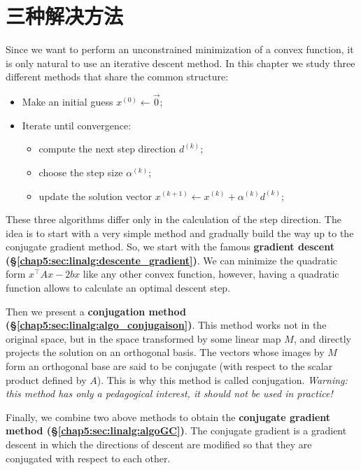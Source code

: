 \documentclass[notitlepage,oneside]{book}
\begin{document}
\section{三种解决方法}
\label{chap5:sec:linalg:formulations_pb}

Since we want to perform an unconstrained minimization of a convex function, it is only natural to use an iterative descent method.
In this chapter we study three different methods that share the common structure:
\begin{framed}
\begin{itemize}
\item Make an initial guess $x^{(0)} \leftarrow \vec{0} $;
\item Iterate until convergence:
\begin{itemize}
   \item compute the next step direction $d^{(k)}$;
   \item choose the step size $\alpha^{(k)}$;
   \item update the solution vector $x^{(k+1)} \leftarrow  x^{(k)}+\alpha^{(k)} d^{(k)}$;
\end{itemize}
\end{itemize}
\end{framed}

These three algorithms differ only in the calculation of the step direction. The idea is to start with a very simple method and gradually build the way up to the conjugate gradient method.
So, we start with the famous \textbf{gradient descent (\S\ref{chap5:sec:linalg:descente_gradient})}.
We can minimize the quadratic form $x^\top Ax-2bx$ like any other convex function, however, having a quadratic function allows to calculate an optimal descent step.

Then we present a \textbf{conjugation method (\S\ref{chap5:sec:linalg:algo_conjugaison})}.
This method works not in the original space, but in the space transformed by some linear map $M$, and directly projects the solution on an orthogonal basis.
The vectors whose images by $M$ form an orthogonal base are said to be conjugate (with respect to the scalar product defined by $A$).
This is why this method is called conjugation. \textit{Warning: this method has only a pedagogical interest, it should not be used in practice!}

Finally, we combine two above methods to obtain the \textbf{conjugate gradient method (\S\ref{chap5:sec:linalg:algoGC})}.
The conjugate gradient is a gradient descent in which the directions of descent are modified so that they are conjugated with respect to each other.
\end{document}
